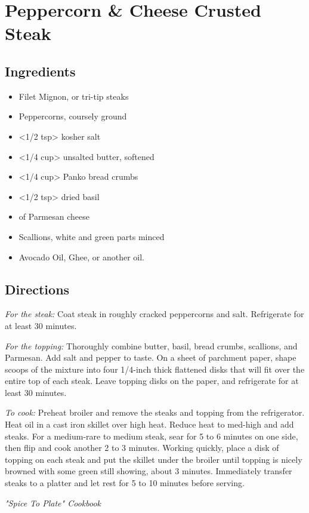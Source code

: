\section{Peppercorn \& Cheese Crusted Steak}

\subsection{ Ingredients }

\begin{itemize}
  \item <20 oz> Filet Mignon, or tri-tip steaks
  \item <2 tbs> Peppercorns, coursely ground
  \item <1/2 tsp> kosher salt
  \item <1/4 cup> unsalted butter, softened
  \item <1/4 cup> Panko bread crumbs
  \item <1/2 tsp> dried basil
  \item <2 tbs> of Parmesan cheese
  \item <2> Scallions, white and green parts minced
  \item <1 tbs> Avocado Oil, Ghee, or another oil. 
\end{itemize}

\subsection{ Directions }

\textit{For the steak:} Coat steak in roughly cracked peppercorns and salt. Refrigerate for at least 30 minutes. 

\textit{For the topping:} Thoroughly combine butter, basil, bread crumbs, scallions, and Parmesan. Add salt and pepper to taste. On a sheet of parchment paper, shape scoops of the mixture into four 1/4-inch thick flattened disks that will fit over the entire top of each steak. Leave topping disks on the paper, and refrigerate for at least 30 minutes. 

\textit{To cook:} Preheat broiler and remove the steaks and topping from the refrigerator. Heat oil in a cast iron skillet over high heat. Reduce heat to med-high and add steaks. For a medium-rare to medium steak, sear for 5 to 6 minutes on one side, then flip and cook another 2 to 3 minutes. Working quickly, place a disk of topping on each steak and put the skillet under the broiler until topping is nicely browned with some green still showing, about 3 minutes. Immediately transfer steaks to a platter and let rest for 5 to 10 minutes before serving. 

\textit{"Spice To Plate" Cookbook}
